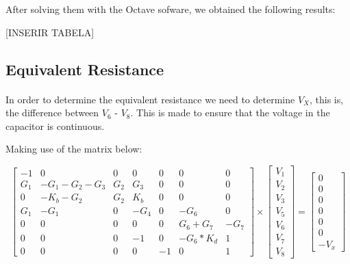 After solving them with the Octave sofware, we obtained the following results:

[INSERIR TABELA]


\subsection{Equivalent Resistance}

\paragraph{}In order to determine the equivalent resistance we need to determine $V_X$, this is, the difference between $V_6$ - $V_8$. This is made to ensure that the voltage in the capacitor is continuous.

Making use of the matrix below:

\begin{equation}
\begin{bmatrix}
	-1	&	0	&	0	&	0	&	0	&	0	&	0 \\
	G_1	&	-G_1 - G_2 - G_3	&	G_2	&	G_3	&	0	&	0	&	0 \\
	0	&	-K_b - G_2	&	G_2	&	K_b	&	0	&	0	&	0 \\
	G_1	&	-G_1	&	0	&	-G_4	&	0	&	-G_6	&	0 \\
	0	&	0	&	0	&	0	&	0	&	G_6 + G_7	&	-G_7 \\
	0	&	0	&	0	&	-1	&	0	&	-G_6 *	K_d	&	1 \\
	0	&	0	&	0	&	0	&	-1	&	0	&	1
\end{bmatrix}
\times
\begin{bmatrix}
	V_1 \\
	V_2 \\
	V_3 \\
	V_5 \\
	V_6 \\
	V_7 \\
	V_8
\end{bmatrix}
=
\begin{bmatrix}
	0 \\
	0 \\
	0 \\
	0 \\
	0 \\
	0 \\
	-V_x
	\label{m:1}
\end{bmatrix}
\end{equation}

